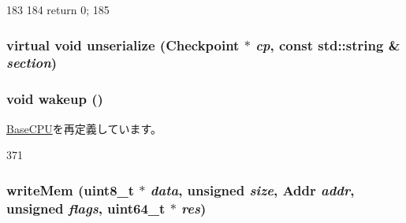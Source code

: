 \begin{DoxyCode}
183     {
184         return 0;
185     }
\end{DoxyCode}
\hypertarget{classCheckerCPU_af100c4e9feabf3cd918619c88c718387}{
\subsubsection[{unserialize}]{\setlength{\rightskip}{0pt plus 5cm}virtual void unserialize ({\bf Checkpoint} $\ast$ {\em cp}, \/  const std::string \& {\em section})}}
\label{classCheckerCPU_af100c4e9feabf3cd918619c88c718387}
\hypertarget{classCheckerCPU_ae674290a26ecbd622c5160e38e8a4fe9}{
\subsubsection[{wakeup}]{\setlength{\rightskip}{0pt plus 5cm}void wakeup ()}}
\label{classCheckerCPU_ae674290a26ecbd622c5160e38e8a4fe9}


\hyperlink{classBaseCPU_a75101f8aee74078c8c3c1d1f3617f7cc}{BaseCPU}を再定義しています。


\begin{DoxyCode}
371 { }
\end{DoxyCode}
\hypertarget{classCheckerCPU_ad46c5edeb1ee9b60445f3e26364e2c5e}{
\subsubsection[{writeMem}]{ writeMem (uint8\_\-t $\ast$ {\em data}, \/  unsigned {\em size}, \/  {\bf Addr} {\em addr}, \/  unsigned {\em flags}, \/  uint64\_\-t $\ast$ {\em res})}}
\label{classCheckerCPU_ad46c5edeb1ee9b60445f3e26364e2c5e}



